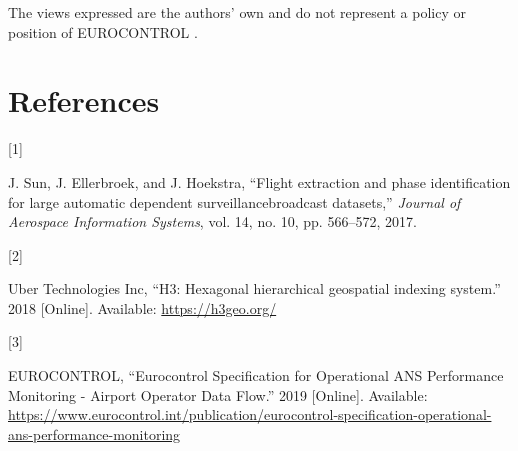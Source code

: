 \documentclass[letterpaper, 10 pt, journal, twoside]{IEEEtran}
\newlength{\cslhangindent}
\newlength{\csllabelwidth}
\newlength{\cslentryspacingunit} %
\newenvironment{CSLReferences}[2] %
 {%
  \setlength{\parindent}{0pt}
  \ifodd #1
  \let\oldpar\par
  \def\par{\hangindent=\cslhangindent\oldpar}
  \fi
  \setlength{\parskip}{#2\cslentryspacingunit}
 }%
 {}
\newcommand{\CSLLeftMargin}[1]{\parbox[t]{\csllabelwidth}{#1}}
\newcommand{\CSLRightInline}[1]{\parbox[t]{\linewidth - \csllabelwidth}{#1}\break}
\begin{document}
The views expressed are the authors' own and do not represent a policy
or position of EUROCONTROL .

\hypertarget{bibliography}{%
\section*{References}\label{bibliography}}

\hypertarget{refs}{}
\begin{CSLReferences}{0}{0}
\leavevmode{}%
\CSLLeftMargin{{[}1{]} }%
\CSLRightInline{J. Sun, J. Ellerbroek, and J. Hoekstra, {``Flight
extraction and phase identification for large automatic dependent
surveillance\textendash broadcast datasets,''} \emph{Journal of
Aerospace Information Systems}, vol. 14, no. 10, pp. 566--572, 2017. }

\leavevmode{}%
\CSLLeftMargin{{[}2{]} }%
\CSLRightInline{Uber Technologies Inc, {``H3: Hexagonal hierarchical
geospatial indexing system.''} 2018 {[}Online{]}. Available:
\url{https://h3geo.org/}}

\leavevmode{}%
\CSLLeftMargin{{[}3{]} }%
\CSLRightInline{EUROCONTROL, {``Eurocontrol {Specification} for
{Operational ANS Performance Monitoring} - {Airport Operator Data
Flow}.''} 2019 {[}Online{]}. Available:
\url{https://www.eurocontrol.int/publication/eurocontrol-specification-operational-ans-performance-monitoring}}

\end{CSLReferences}

\end{document}
